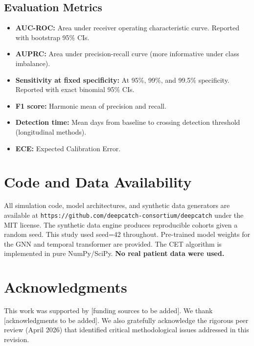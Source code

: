 \documentclass[10pt,a4paper]{article}
\begin{document}
\subsection{Evaluation Metrics}

\begin{itemize}
\item \textbf{AUC-ROC:} Area under receiver operating characteristic curve. Reported with bootstrap 95\% CIs.
\item \textbf{AUPRC:} Area under precision-recall curve (more informative under class imbalance).
\item \textbf{Sensitivity at fixed specificity:} At 95\%, 99\%, and 99.5\% specificity. Reported with exact binomial 95\% CIs.
\item \textbf{F1 score:} Harmonic mean of precision and recall.
\item \textbf{Detection time:} Mean days from baseline to crossing detection threshold (longitudinal methods).
\item \textbf{ECE:} Expected Calibration Error.
\end{itemize}


\section{Code and Data Availability}

All simulation code, model architectures, and synthetic data generators are available at \texttt{https://github.com/deepcatch-consortium/deepcatch} under the MIT license. The synthetic data engine produces reproducible cohorts given a random seed. This study used seed=42 throughout. Pre-trained model weights for the GNN and temporal transformer are provided. The CET algorithm is implemented in pure NumPy/SciPy. \textbf{No real patient data were used.}


\section*{Acknowledgments}
This work was supported by [funding sources to be added]. We thank [acknowledgments to be added]. We also gratefully acknowledge the rigorous peer review (April 2026) that identified critical methodological issues addressed in this revision.
\end{document}
